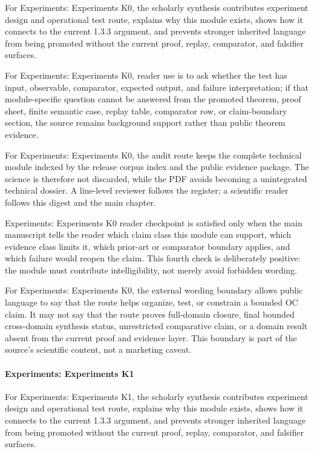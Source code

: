 For Experiments: Experiments K0, the scholarly synthesis contributes experiment design and operational test route, explains why this module exists, shows how it connects to the current 1.3.3 argument, and prevents stronger inherited language from being promoted without the current proof, replay, comparator, and falsifier surfaces.


For Experiments: Experiments K0, reader use is to ask whether the test has input, observable, comparator, expected output, and failure interpretation; if that module-specific question cannot be answered from the promoted theorem, proof sheet, finite semantic case, replay table, comparator row, or claim-boundary section, the source remains background support rather than public theorem evidence.


For Experiments: Experiments K0, the audit route keeps the complete technical module indexed by the release corpus index and the public evidence package. The science is therefore not discarded, while the PDF avoids becoming a unintegrated technical dossier. A line-level reviewer follows the register; a scientific reader follows this digest and the main chapter.


Experiments: Experiments K0 reader checkpoint is satisfied only when the main manuscript tells the reader which claim class this module can support, which evidence class limits it, which prior-art or comparator boundary applies, and which failure would reopen the claim. This fourth check is deliberately positive: the module must contribute intelligibility, not merely avoid forbidden wording.


For Experiments: Experiments K0, the external wording boundary allows public language to say that the route helps organize, test, or constrain a bounded OC claim. It may not say that the route proves full-domain closure, final bounded cross-domain synthesis status, unrestricted comparative claim, or a domain result absent from the current proof and evidence layer. This boundary is part of the source's scientific content, not a marketing caveat.


\paragraph{Experiments: Experiments K1}

For Experiments: Experiments K1, the scholarly synthesis contributes experiment design and operational test route, explains why this module exists, shows how it connects to the current 1.3.3 argument, and prevents stronger inherited language from being promoted without the current proof, replay, comparator, and falsifier surfaces.


